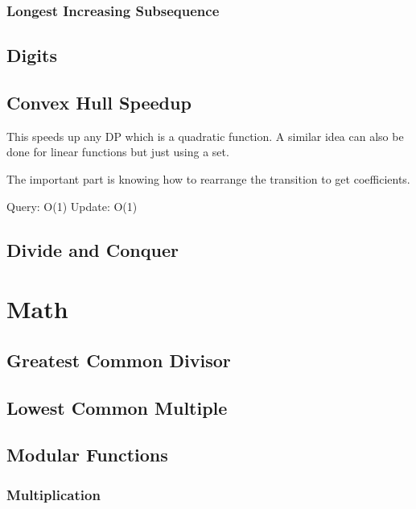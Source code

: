 \documentclass{article}
\begin{document}
\subsubsection{Longest Increasing Subsequence}


\subsection{Digits}


\subsection{Convex Hull Speedup}
\begin{flushleft}
This speeds up any DP which is a quadratic function.
A similar idea can also be done for linear functions but just using a set.

The important part is knowing how to rearrange the transition to get coefficients.

Query: O(1)
Update: O(1)
\end{flushleft}


\subsection{Divide and Conquer}


\section{Math}
\subsection{Greatest Common Divisor}

\subsection{Lowest Common Multiple}


\subsection{Modular Functions}
\subsubsection{Multiplication}

\end{document}
